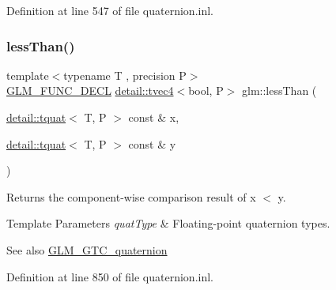Definition at line 547 of file quaternion.\+inl.

\mbox{\label{group__gtc__quaternion_ga4e4c37b86cecde7e1076c5b5fdb920b9}} 
\subsubsection{\texorpdfstring{less\+Than()}{lessThan()}}
{\footnotesize\ttfamily template$<$typename T , precision P$>$ \\
\hyperlink{setup_8hpp_ab2d052de21a70539923e9bcbf6e83a51}{G\+L\+M\+\_\+\+F\+U\+N\+C\+\_\+\+D\+E\+CL} \hyperlink{structglm_1_1detail_1_1tvec4}{detail\+::tvec4}$<$bool, P$>$ glm\+::less\+Than (\begin{DoxyParamCaption}\item[{\hyperlink{structglm_1_1detail_1_1tquat}{detail\+::tquat}$<$ T, P $>$ const \&}]{x,  }\item[{\hyperlink{structglm_1_1detail_1_1tquat}{detail\+::tquat}$<$ T, P $>$ const \&}]{y }\end{DoxyParamCaption})}

Returns the component-\/wise comparison result of x $<$ y.


\begin{DoxyTemplParams}{Template Parameters}
{\em quat\+Type} & Floating-\/point quaternion types.\\
\hline
\end{DoxyTemplParams}
\begin{DoxySeeAlso}{See also}
\hyperlink{group__gtc__quaternion}{G\+L\+M\+\_\+\+G\+T\+C\+\_\+quaternion} 
\end{DoxySeeAlso}


Definition at line 850 of file quaternion.\+inl.

\mbox{\label{group__gtc__quaternion_ga313fe20896a8cd43c6d08cc88fa18faa}} 
